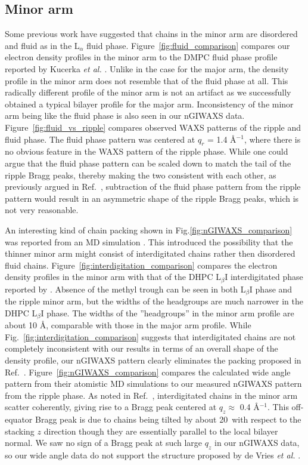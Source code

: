 \subsection{Minor arm}
Some previous work have suggested that chains in the minor arm are disordered 
and fluid as in the L$_\alpha$ fluid phase.
Figure~\ref{fig:fluid_comparison} compares our electron density profiles
in the minor arm to the DMPC fluid phase profile reported by 
Kucerka \textit{et al.} \cite{Kucerka05_BPJ}.
Unlike in the case for the major arm, the density profile in the minor arm
does not resemble that of the fluid phase at all. This radically different
profile of the minor arm is not an artifact as we successfully obtained 
a typical bilayer profile for the major arm.
Inconsistency of the minor arm being like the fluid phase is also seen in our nGIWAXS data.
Figure~\ref{fig:fluid_vs_ripple} compares observed WAXS patterns of the ripple and 
fluid phase. The fluid phase pattern was centered at $q_r$ = 1.4 \AA$^{-1}$, where
there is no obvious feature in the WAXS pattern of the ripple phase. While one
could argue that the fluid phase pattern can be scaled down to match the tail
of the ripple Bragg peaks, thereby making the two consistent with each other, 
as previously argued in Ref.~\cite{ref:Cunningham98}, 
subtraction of the fluid phase pattern from the ripple pattern would result
in an asymmetric shape of the ripple Bragg peaks, which is not very reasonable.

An interesting kind of chain packing shown in Fig.\ref{fig:nGIWAXS_comparison} 
was reported from an MD simulation \cite{ref:deVries05}. This introduced the 
possibility that the thinner minor arm might consist of interdigitated chains 
rather then disordered fluid chains.  
Figure~\ref{fig:interdigitation_comparison} compares the electron density
profiles in the minor arm with that of the DHPC L$_\beta\text{I}$ interdigitated phase
reported by \cite{ref:Guler09}. Absence of the methyl trough can be seen in
both L$_\beta\text{I}$ phase and the ripple minor arm, but the widths of the
headgroups are much narrower in the DHPC L$_\beta\text{I}$ phase. The widths
of the ''headgroups'' in the minor arm profile are about 10 \AA, comparable
with those in the major arm profile. While Fig.~\ref{fig:interdigitation_comparison}
suggests that interdigitated chains are not completely inconsistent with 
our results in terms of an overall shape of the density profile, 
our nGIWAXS pattern clearly eliminates the packing proposed in 
Ref.~\cite{ref:deVries05}. Figure~\ref{fig:nGIWAXS_comparison} compares
the calculated wide angle pattern from their atomistic MD simulations
to our measured nGIWAXS pattern from the ripple phase. As noted in
Ref.~\cite{ref:deVries05}, interdigitated chains in the minor arm scatter
coherently, giving rise to a Bragg peak centered at $q_z \approx$ 0.4 \AA$^{-1}$.
This off-equator Bragg peak is due to chains being tilted by about 20\textdegree\
with respect to the stacking $z$ direction though they
are essentially parallel to the local bilayer normal.
We saw no sign of a Bragg peak at such large $q_z$ in our nGIWAXS
data, so our wide angle data do not support the structure proposed by
de Vries \textit{et al.} \cite{ref:deVries05}.

